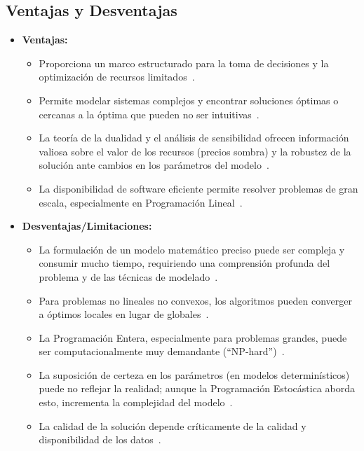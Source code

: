 \subsection{Ventajas y Desventajas}

\begin{itemize}
    \item \textbf{Ventajas:}
    \begin{itemize}
        \item Proporciona un marco estructurado para la toma de decisiones y la optimización de recursos limitados~\cite[p.~182]{bradley1977applied}.
        \item Permite modelar sistemas complejos y encontrar soluciones óptimas o cercanas a la óptima que pueden no ser intuitivas~\cite[p.~183]{bradley1977applied}.
        \item La teoría de la dualidad y el análisis de sensibilidad ofrecen información valiosa sobre el valor de los recursos (precios sombra) y la robustez de la solución ante cambios en los parámetros del modelo~\cite[p.~78-91]{bradley1977applied}.
        \item La disponibilidad de software eficiente permite resolver problemas de gran escala, especialmente en Programación Lineal~\cite[p.~182]{bradley1977applied}.
    \end{itemize}

    \item \textbf{Desventajas/Limitaciones:}
    \begin{itemize}
        \item La formulación de un modelo matemático preciso puede ser compleja y consumir mucho tiempo, requiriendo una comprensión profunda del problema y de las técnicas de modelado~\cite[p.~183]{bradley1977applied}.
        \item Para problemas no lineales no convexos, los algoritmos pueden converger a óptimos locales en lugar de globales~\cite[p.~413]{nocedal2006}.
        \item La Programación Entera, especialmente para problemas grandes, puede ser computacionalmente muy demandante (``NP-hard'')~\cite[p.~287]{bradley1977pe}.
        \item La suposición de certeza en los parámetros (en modelos determinísticos) puede no reflejar la realidad; aunque la Programación Estocástica aborda esto, incrementa la complejidad del modelo~\cite[p.~432]{sinha2006}.
        \item La calidad de la solución depende críticamente de la calidad y disponibilidad de los datos~\cite[p.~183]{bradley1977applied}.
    \end{itemize}
\end{itemize}
